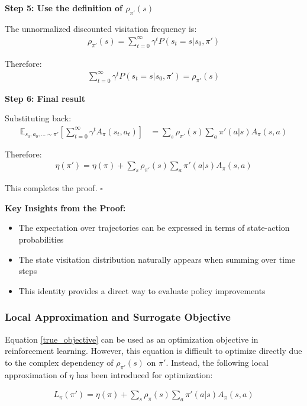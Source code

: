 \textbf{Step 5: Use the definition of $\rho_{\pi'}(s)$}

The unnormalized discounted visitation frequency is:
\begin{align}
\rho_{\pi'}(s) = \sum_{t = 0}^{\infty} \gamma^t P(s_t = s | s_0, \pi')
\end{align}

Therefore:
\begin{align}
\sum_{t = 0}^{\infty} \gamma^t P(s_t = s | s_0, \pi') = \rho_{\pi'}(s)
\end{align}

\textbf{Step 6: Final result}

Substituting back:
\begin{align}
\mathbb{E}_{s_{0}, a_{0}, \ldots \sim \pi'} \left[ \sum_{t = 0}^{\infty} \gamma^t A_\pi(s_t, a_t) \right] &= \sum_{s} \rho_{\pi'}(s) \sum_{a} \pi'(a | s) A_\pi(s, a)
\end{align}

Therefore:
\begin{align}
\eta(\pi') = \eta(\pi) + \sum_{s}\rho_{\pi'}(s)\sum_{a}\pi'(a|s)A_{\pi}(s, a)
\end{align}

This completes the proof. $\square$

\textbf{Key Insights from the Proof:}
\begin{itemize}
    \item The expectation over trajectories can be expressed in terms of state-action probabilities
    \item The state visitation distribution naturally appears when summing over time steps
    \item This identity provides a direct way to evaluate policy improvements
\end{itemize}

\subsubsection{Local Approximation and Surrogate Objective}

Equation \ref{true_objective} can be used as an optimization objective in reinforcement learning. However, this equation is difficult to optimize directly due to the complex dependency of $\rho_{\pi'}(s)$ on $\pi'$. Instead, the following local approximation of $\eta$ has been introduced for optimization:

\begin{align}\label{approx_objective}
    L_{\pi}(\pi') = \eta(\pi) + \sum_{s}\rho_{\pi}(s)\sum_{a}\pi'(a|s)A_{\pi}(s, a)
\end{align}

